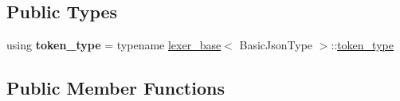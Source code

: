 \subsection*{Public Types}
\begin{DoxyCompactItemize}
\item 
\mbox{\label{classnlohmann_1_1detail_1_1lexer_a986907dff5ceb4fa06aa8ff301822726}} 
using {\bfseries token\+\_\+type} = typename \hyperlink{classnlohmann_1_1detail_1_1lexer__base}{lexer\+\_\+base}$<$ Basic\+Json\+Type $>$\+::\hyperlink{classnlohmann_1_1detail_1_1lexer__base_aa3538cce439a2de6c7893e627b38c454}{token\+\_\+type}
\end{DoxyCompactItemize}
\subsection*{Public Member Functions}
